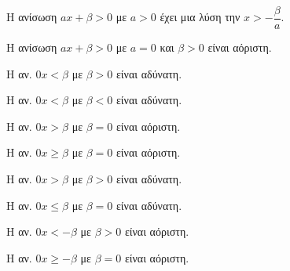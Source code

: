 \begin{alist}
\item Η ανίσωση $ ax+\beta>0 $ με $ a>0 $ έχει μια λύση την $ x>-\dfrac{\beta}{a} $.
\item Η ανίσωση $ ax+\beta>0 $ με $ a=0 $ και $ \beta>0 $ είναι αόριστη.
\begin{multicols}{2}
\item Η αν. $ 0x<\beta $ με $ \beta>0 $ είναι αδύνατη.
\item Η αν. $ 0x<\beta $ με $ \beta<0 $ είναι αδύνατη.
\item Η αν. $ 0x>\beta $ με $ \beta=0 $ είναι αόριστη.
\item Η αν. $ 0x\geq\beta $ με $ \beta=0 $ είναι αόριστη.
\item Η αν. $ 0x>\beta $ με $ \beta>0 $ είναι αδύνατη.
\item Η αν. $ 0x\leq\beta $ με $ \beta=0 $ είναι αδύνατη.
\item Η αν. $ 0x<-\beta $ με $ \beta>0 $ είναι αόριστη.
\item Η αν. $ 0x\geq-\beta $ με $ \beta=0 $ είναι αόριστη.
\end{multicols}
\end{alist}
